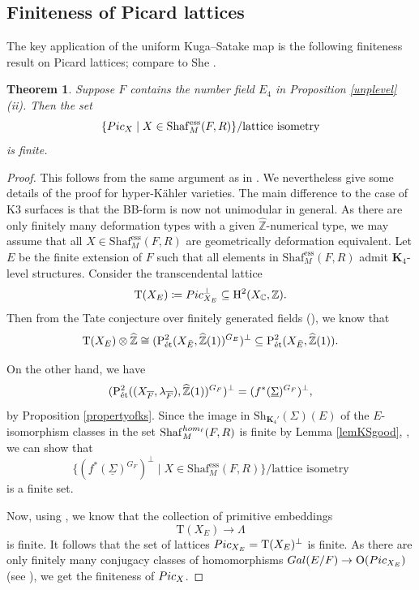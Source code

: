 \documentclass[11pt,reqno,oneside]{amsart}
\numberwithin{equation}{section}
\newtheorem{theorem}{Theorem}[section]
\theoremstyle{definition}
\DeclareMathOperator{\ess}{ess}
\newcommand{\Pic}{{\rm Pic}}
\newcommand{\Gal}{{\rm Gal}}
\DeclareMathOperator{\et}{\Acute{e}t}
\newcommand{\Sh}{\mathrm{Sh}}
\renewcommand{\hom}{{\rm hom}}
\newcommand{\Sha}{\mathrm{Shaf}}
\newcommand\rH{\mathrm{H}}
\newcommand{\rT}{\mathrm{T}}
\newcommand\rP{\mathrm{P}}
\newcommand{\CC}{\mathbb{C}}
\newcommand{\ZZ}{\mathbb{Z}}
\begin{document}
\subsection{Finiteness of Picard lattices} The key application of the uniform Kuga--Satake map is the following finiteness result on Picard lattices; compare to She \cite[Corollary 4.1.14]{Sh17}.
\begin{theorem}\label{boundedpolarization}
 Suppose $F$ contains the number field $E_{4}$ in Proposition \ref{unplevel} (ii). Then the set \[
\{\Pic_{X}  \mid  X \in \Sha_M^{\ess}(F,R)
\}/ \text{lattice isometry}
\]
is finite.
\end{theorem}
\begin{proof}
 This follows from the same argument as in \cite{Sh17,Takamatsu2020K3}. We nevertheless give some details of the proof for  hyper-Kähler varieties. The main difference to the case of K3 surfaces is that the BB-form is now not unimodular in general.  As there are only finitely many deformation types with a given $\widehat{\ZZ}$-numerical type, we may assume that all $X\in \Sha_M^{\ess}(F,R)$ are geometrically deformation equivalent. Let $E$ be the finite extension of $F$ such that all elements in $\Sha_M^{\ess}(F,R)$ admit $\mathbf{K}_4$-level structures.
Consider the transcendental lattice 
\[
\rT(X_E)\coloneqq\Pic_{X_E}^\perp \subseteq \rH^2(X_\CC,\ZZ).
\]
Then from the Tate conjecture over finitely generated fields (),  we know that  \[
\rT(X_E)\otimes \widehat{\ZZ}\cong (\rP^2_{\et} (X_{\bar{E}},\widehat{\ZZ}(1))^{G_E})^\perp \subseteq \rP^2_{\et}(X_{\bar{E}},\widehat{\ZZ}(1)).
\]

On the other hand, we have 
\[
(\rP^{2}_{\et} ((X_{\overline{F}}, \lambda_{\overline{F}}), \widehat{\ZZ}(1))^{G_{F}})^{\perp} = (f^*(\underline{\Sigma})^{G_{F}})^{\perp},
\]
by Proposition \ref{propertyofks}. Since the image in $\Sh_{\mathbf{K}_4'}(\Sigma)(E)$ of the $E$-isomorphism classes in the set $\Sha^{\hom_\ell}_M(F,R)$ is finite by Lemma \ref{lemKSgood}, \cite[VI, \S1, Theorem 2]{Faltings1992}, we can show that
\[
\{
(f^*(\underline{\Sigma})^{G_{F}})^{\perp} \mid X \in \Sha_M^{\ess}(F,R)
\}/\text{lattice isometry}
\]
is a finite set.


Now, using \cite[San 30.2]{Kn02}, we know that  the collection of  primitive embeddings $$\rT(X_E)\rightarrow \Lambda$$ is finite.  It follows that the set of  lattices $\Pic_{X_E}=\rT(X_E)^\perp$  is finite. As there are only finitely many conjugacy classes of homomorphisms $\Gal(E/F) \to \mathrm{O}(\Pic_{X_E})$ (see \cite[Theorem 4.3]{PR94}), we get the finiteness of $\Pic_X$.
\end{proof}
\end{document}
